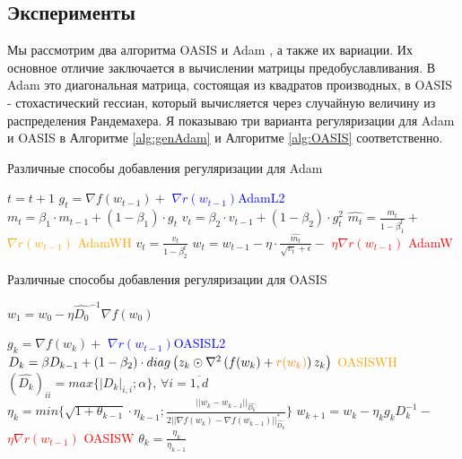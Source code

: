 \subsection{Эксперименты} 
\label{Experiments}

Мы рассмотрим два алгоритма OASIS \citep{goldberg2011oasis} и Adam \citep{kingma2014adam}, а также их вариации. Их основное отличие заключается в вычислении матрицы предобуславливания.
В Adam это диагональная матрица, состоящая из квадратов производных, в OASIS - стохастический гессиан, который вычисляется через случайную величину из распределения Рандемахера.  Я показываю три варианта регуляризации для Adam и OASIS в Алгоритме \ref{alg:genAdam} и Алгоритме \ref{alg:OASIS} соответственно.

\begin{algorithm}[H]
            \caption{Различные способы добавления регуляризации для Adam}
            \label{alg:genAdam}    
            \begin{algorithmic}
            \small{
            \State $t = t+1$
            \State $g_t = \nabla f(w_{t-1}) + $ \textcolor{blue}{$\nabla r(w_{t-1})$}\hfill \textcolor{blue}{AdamL2}
            \State $m_t = \beta_1 \cdot m_{t-1} + (1 - \beta_1) \cdot g_t$
            \State $v_t = \beta_2 \cdot v_{t-1} + (1 - \beta_2) \cdot g_t^2$
            \State $\hat{m_t} = \frac{m_t}{1-\beta_1^t} +$ \textcolor{orange}{$\nabla r(w_{t-1})$} \hfill \textcolor{orange}{AdamWH}
            \State $\hat{v_t} = \frac{v_t}{1-\beta_2^t}$ 
            \State $w_t = w_{t-1} - \eta \cdot \frac{\hat{m_t}}{\sqrt{v_t} + \epsilon} - $ \textcolor{red}{$\eta \nabla r(w_{t-1})$ } \hfill \textcolor{red}{AdamW}
            \EndWhile
            }
\end{algorithmic}
\end{algorithm}

\begin{algorithm}[H]
\caption{Различные способы добавления регуляризации для OASIS}\label{alg:OASIS}
\begin{algorithmic}
    \State $w_1 = w_0 - \eta \hat{D_0}^{-1} \nabla f(w_0)$

    \State $g_k = \nabla f(w_k) +$ \textcolor{blue}{$\nabla r(w_{t-1})$}\hfill \textcolor{blue}{OASISL2} 
    \State $D_k = \beta D_{k-1} + (1-\beta_2) \cdot diag\left( z_k \odot \nabla^2 \left(f(w_k) + \textcolor{orange}{r(w_k)} \right) z_k \right)$ \hfill \textcolor{orange}{OASISWH}
    \State $(\hat{D_k})_{ii} = max \{|D_k|_{i, i} ; \alpha \}$, $\forall i = \overline{1, d}$
    \State $\eta_k = min \{ \sqrt{1 + \theta_{k-1}} \cdot \eta_{k-1}; \frac{||w_k - w_{k-1}||_{\hat{D_k}}}{2 ||\nabla f(w_k) - \nabla f(w_{k-1}) ||_{\hat{D_k}}^* } \}$
    \State $w_{k+1} = w_k - \eta_k g_k D_k^{-1}- $ \textcolor{red}{$\eta \nabla r(w_{t-1})$ } \hfill \textcolor{red}{OASISW} 
    \State $\theta_k = \frac{\eta_k}{\eta_{k-1}}$
    \EndFor
\end{algorithmic}
\end{algorithm}

